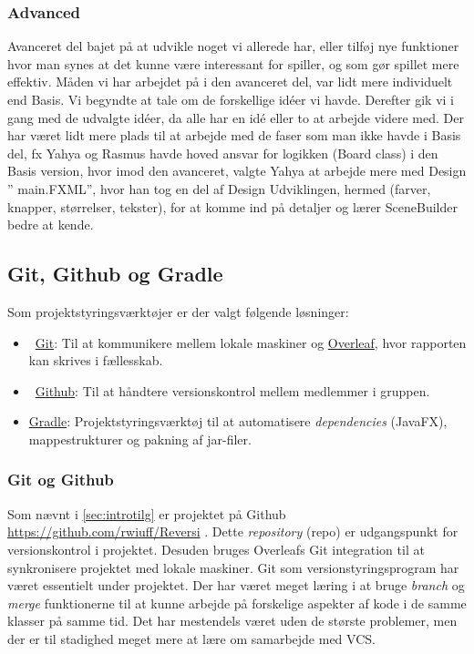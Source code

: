 \subsubsection {Advanced}\label{PAC}
Avanceret del bajet på at udvikle noget vi allerede har, eller tilføj nye funktioner hvor man synes at det kunne være interessant for spiller, og som gør spillet mere effektiv.
Måden vi har arbejdet på i den avanceret del, var lidt mere individuelt end Basis. 
Vi begyndte at tale om de forskellige idéer vi havde. Derefter gik vi i gang med de udvalgte idéer, da alle har en idé eller to at arbejde videre med.
Der har været lidt mere plads til at arbejde med de faser som man ikke havde i Basis del, fx Yahya og Rasmus havde hoved ansvar for logikken (Board class) i den Basis version, hvor imod den avanceret, valgte Yahya at arbejde mere med Design ” main.FXML”, hvor han tog en del af Design Udviklingen, hermed (farver, knapper, størrelser, tekster), for at komme ind på detaljer og lærer SceneBuilder bedre at kende.
\subsection{Git, Github og Gradle}\label{sec:GGG}
Som projektstyringsværktøjer er der valgt følgende løsninger:
\begin{itemize}
    \item \faGit \ \href{https://git-scm.com/}{Git}: Til at kommunikere mellem lokale maskiner og \href{https://www.overleaf.com/}{Overleaf}, hvor rapporten kan skrives i fællesskab.
    \item \faGithub \ \href{https://github.com/}{Github}: Til at håndtere versionskontrol mellem medlemmer i gruppen.
    \item \href{https://gradle.org/}{Gradle}: Projektstyringsværktøj til at automatisere \emph{dependencies} (JavaFX), mappestrukturer og pakning af jar-filer.
\end{itemize}
\subsubsection{Git og Github}
Som nævnt i \cref{sec:introtilg} er projektet på Github \href{https://github.com/rwiuff/Reversi}{https://github.com/rwiuff/Reversi} . Dette \emph{repository} (repo) er udgangspunkt for versionskontrol i projektet. Desuden bruges Overleafs Git integration til at synkronisere projektet med lokale maskiner. Git som versionstyringsprogram har været essentielt under projektet. Der har været meget læring i at bruge \emph{branch} og \emph{merge} funktionerne til at kunne arbejde på forskelige aspekter af kode i de samme klasser på samme tid. Det har mestendels været uden de største problemer, men der er til stadighed meget mere at lære om samarbejde med VCS.

